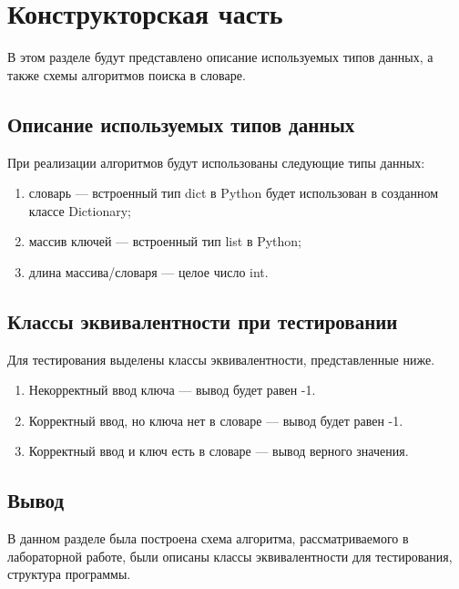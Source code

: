 \chapter{Конструкторская часть}
В этом разделе будут представлено описание используемых типов данных,
а также схемы алгоритмов поиска в словаре.

\section{Описание используемых типов данных}
При реализации алгоритмов будут использованы следующие типы данных:
\begin{enumerate}[label=\arabic*)]
	\item словарь --- встроенный тип dict \cite{pythondict} в Python\cite{pythonlang} будет использован в созданном классе Dictionary;
	\item массив ключей --- встроенный тип list \cite{pythonlist} в Python\cite{pythonlang};
	\item длина массива/словаря --- целое число int.
\end{enumerate}

\section{Классы эквивалентности при тестировании}
Для тестирования выделены классы эквивалентности, представленные ниже.
\begin{enumerate}
	\item Некорректный ввод ключа --- вывод будет равен -1.
	\item Корректный ввод, но ключа нет в словаре --- вывод будет равен -1.
	\item Корректный ввод и ключ есть в словаре --- вывод верного значения.
\end{enumerate}

\section{Вывод}
В данном разделе была построена схема алгоритма, рассматриваемого в лабораторной работе, были описаны классы эквивалентности для тестирования, структура программы.